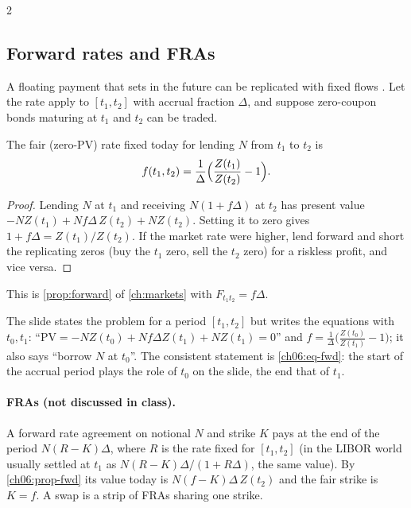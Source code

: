 \begin{paracol}{2}
\subsection{Forward rates and FRAs}
A floating payment that sets in the future can be replicated with fixed flows . Let the rate
apply to $[t_1,t_2]$ with accrual fraction $\Delta$, and suppose zero-coupon bonds maturing at $t_1$ and $t_2$
can be traded.

\begin{proposition}\label{ch06:prop-fwd}
The fair (zero-PV) rate fixed today for lending $N$ from $t_1$ to $t_2$ is
\begin{equation}\label{ch06:eq-fwd}
  f(t_1,t_2)=\frac1\Delta\Bigl(\frac{Z(t_1)}{Z(t_2)}-1\Bigr).
\end{equation}
\end{proposition}
\begin{proof}
Lending $N$ at $t_1$ and receiving $N(1+f\Delta)$ at $t_2$ has present value
$-NZ(t_1)+Nf\Delta\,Z(t_2)+NZ(t_2)$. Setting it to zero gives $1+f\Delta=Z(t_1)/Z(t_2)$. If the market rate were
higher, lend forward and short the replicating zeros (buy the $t_1$ zero, sell the $t_2$ zero) for a riskless
profit, and vice versa.
\end{proof}
This is \cref{prop:forward} of \cref{ch:markets} with $F_{t_1t_2}=f\Delta$.

\begin{coursenote}
The slide states the problem for a period $[t_1,t_2]$ but writes the equations with $t_0,t_1$:
``$\mathrm{PV}=-NZ(t_0)+Nf\Delta Z(t_1)+NZ(t_1)=0$'' and $f=\frac1\Delta\bigl(\frac{Z(t_0)}{Z(t_1)}-1\bigr)$; it also
says ``borrow $N$ at $t_0$''. The consistent statement is \eqref{ch06:eq-fwd}: the start of the accrual period
plays the role of $t_0$ on the slide, the end that of $t_1$.
\end{coursenote}

\paragraph{FRAs (not discussed in class).} A forward rate agreement on notional $N$ and strike $K$ pays at
the end of the period $N(R-K)\Delta$, where $R$ is the rate fixed for $[t_1,t_2]$ (in the LIBOR world
usually settled at $t_1$ as $N(R-K)\Delta/(1+R\Delta)$, the same value). By \cref{ch06:prop-fwd} its value today
is $N(f-K)\Delta\,Z(t_2)$ and the fair strike is $K=f$. A swap is a strip of FRAs sharing one strike.


\end{paracol}
